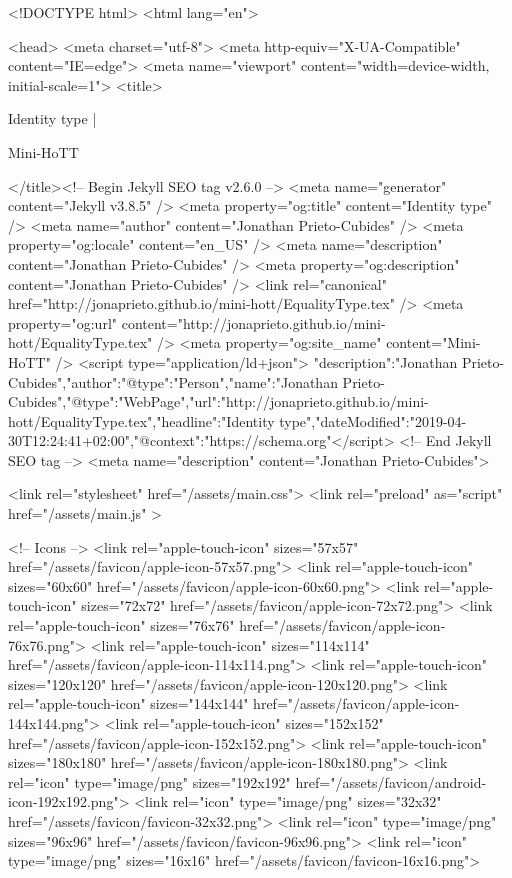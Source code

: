 <!DOCTYPE html>
<html lang="en">

<head>
  <meta charset="utf-8">
  <meta http-equiv="X-UA-Compatible" content="IE=edge">
  <meta name="viewport" content="width=device-width, initial-scale=1">
  <title>
    
      
        Identity type |
      
        Mini-HoTT
    
  </title><!-- Begin Jekyll SEO tag v2.6.0 -->
<meta name="generator" content="Jekyll v3.8.5" />
<meta property="og:title" content="Identity type" />
<meta name="author" content="Jonathan Prieto-Cubides" />
<meta property="og:locale" content="en_US" />
<meta name="description" content="Jonathan Prieto-Cubides" />
<meta property="og:description" content="Jonathan Prieto-Cubides" />
<link rel="canonical" href="http://jonaprieto.github.io/mini-hott/EqualityType.tex" />
<meta property="og:url" content="http://jonaprieto.github.io/mini-hott/EqualityType.tex" />
<meta property="og:site_name" content="Mini-HoTT" />
<script type="application/ld+json">
{"description":"Jonathan Prieto-Cubides","author":{"@type":"Person","name":"Jonathan Prieto-Cubides"},"@type":"WebPage","url":"http://jonaprieto.github.io/mini-hott/EqualityType.tex","headline":"Identity type","dateModified":"2019-04-30T12:24:41+02:00","@context":"https://schema.org"}</script>
<!-- End Jekyll SEO tag -->
<meta name="description" content="Jonathan Prieto-Cubides">

  <link rel="stylesheet" href="/assets/main.css">
  <link rel="preload" as="script" href="/assets/main.js" >

  <!-- Icons -->
  <link rel="apple-touch-icon" sizes="57x57" href="/assets/favicon/apple-icon-57x57.png">
  <link rel="apple-touch-icon" sizes="60x60" href="/assets/favicon/apple-icon-60x60.png">
  <link rel="apple-touch-icon" sizes="72x72" href="/assets/favicon/apple-icon-72x72.png">
  <link rel="apple-touch-icon" sizes="76x76" href="/assets/favicon/apple-icon-76x76.png">
  <link rel="apple-touch-icon" sizes="114x114" href="/assets/favicon/apple-icon-114x114.png">
  <link rel="apple-touch-icon" sizes="120x120" href="/assets/favicon/apple-icon-120x120.png">
  <link rel="apple-touch-icon" sizes="144x144" href="/assets/favicon/apple-icon-144x144.png">
  <link rel="apple-touch-icon" sizes="152x152" href="/assets/favicon/apple-icon-152x152.png">
  <link rel="apple-touch-icon" sizes="180x180" href="/assets/favicon/apple-icon-180x180.png">
  <link rel="icon" type="image/png" sizes="192x192"  href="/assets/favicon/android-icon-192x192.png">
  <link rel="icon" type="image/png" sizes="32x32" href="/assets/favicon/favicon-32x32.png">
  <link rel="icon" type="image/png" sizes="96x96" href="/assets/favicon/favicon-96x96.png">
  <link rel="icon" type="image/png" sizes="16x16" href="/assets/favicon/favicon-16x16.png">

